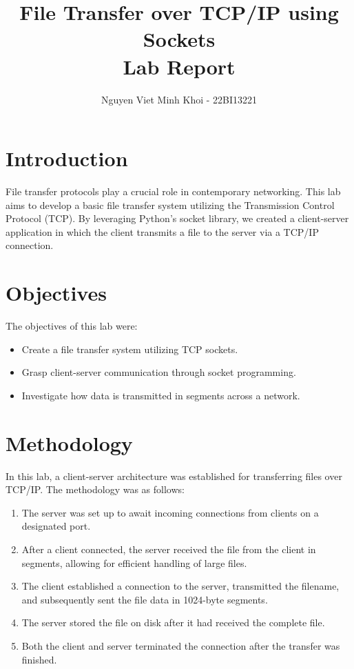 \documentclass[a4paper,12pt]{article}
\title{File Transfer over TCP/IP using Sockets\\ \large Lab Report}
\author{Nguyen Viet Minh Khoi - 22BI13221}
\begin{document}
\maketitle

\section{Introduction}
File transfer protocols play a crucial role in contemporary networking. This lab aims to develop a basic file transfer system utilizing the Transmission Control Protocol (TCP). By leveraging Python's socket library, we created a client-server application in which the client transmits a file to the server via a TCP/IP connection.

\section{Objectives}
The objectives of this lab were:
\begin{itemize}
    \item Create a file transfer system utilizing TCP sockets.
    \item Grasp client-server communication through socket programming.
    \item Investigate how data is transmitted in segments across a network.

\end{itemize}

\section{Methodology}
In this lab, a client-server architecture was established for transferring files over TCP/IP. The methodology was as follows:

\begin{enumerate}
    \item The server was set up to await incoming connections from clients on a designated port.
    \item After a client connected, the server received the file from the client in segments, allowing for efficient handling of large files.
    \item The client established a connection to the server, transmitted the filename, and subsequently sent the file data in 1024-byte segments.
    \item The server stored the file on disk after it had received the complete file.
    \item Both the client and server terminated the connection after the transfer was finished.
\end{enumerate}
\end{document}
